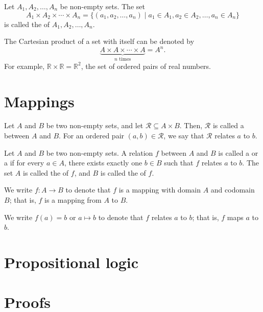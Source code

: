 \begin{defn}
Let $ A_1,A_2,\ldots,A_n $ be non-empty sets. The set
\begin{equation*}
    A_1\times A_2\times \cdots\times A_n=\{(a_1,a_2,\ldots,a_n)\mid a_1\in A_1,a_2\in A_2,\ldots,a_n\in A_n\}
\end{equation*}
is called the  of $ A_1,A_2,\ldots,A_n $.
\end{defn}

The Cartesian product of a set with itself can be denoted by
\begin{equation*}
    \underbrace{A\times A\times\cdots\times A}_{n\text{ times}}=A^n.
\end{equation*}
For example, $ \mathbb{R}\times\mathbb{R}=\mathbb{R}^2 $, the set of ordered pairs of real numbers.

\section{Mappings}

\begin{defn}
Let $ A $ and $ B $ be two non-empty sets, and let $ \mathcal{R}\subseteq A\times B $. Then, $ \mathcal{R} $ is called a  between $ A $ and $ B $. For an ordered pair $ (a,b)\in\mathcal{R} $, we say that $ \mathcal{R} $ relates $ a $ to $ b $.
\end{defn}

\begin{defn}
Let $ A $ and $ B $ be two non-empty sets. A relation $ f $ between $ A $ and $ B $ is called a  or a  if for every $ a\in A $, there exists exactly one $ b\in B $ such that $ f $ relates $ a $ to $ b $. The set $ A $ is called the  of $ f $, and $ B $ is called the  of $ f $.

We write $ f:A\to B $ to denote that $ f $ is a mapping with domain $ A $ and codomain $ B $; that is, $ f $ is a mapping from $ A $ to $ B $.

We write $ f(a)=b $ or $ a\mapsto b $ to denote that $ f $ relates $ a $ to $ b $; that is, $ f $ maps $ a $ to $ b $.
\end{defn}

\section{Propositional logic}

\section{Proofs}